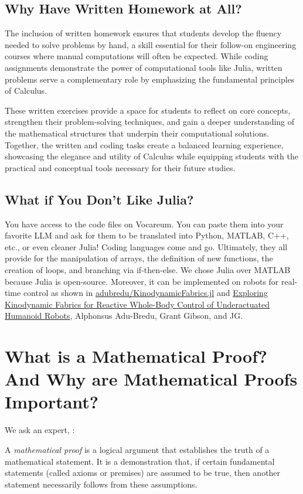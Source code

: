 \subsection{Why Have Written Homework at All?}

The inclusion of written homework ensures that students develop the fluency needed to solve problems by hand, a skill essential for their follow-on engineering courses where manual computations will often be expected. While coding assignments demonstrate the power of computational tools like Julia, written problems serve a complementary role by emphasizing the fundamental principles of Calculus.

These written exercises provide a space for students to reflect on core concepts, strengthen their problem-solving techniques, and gain a deeper understanding of the mathematical structures that underpin their computational solutions. Together, the written and coding tasks create a balanced learning experience, showcasing the elegance and utility of Calculus while equipping students with the practical and conceptual tools necessary for their future studies.

\subsection{What if You Don't Like Julia?}

You have access to the code files on Vocareum. You can paste them into your favorite LLM and ask for them to be translated into Python, MATLAB, C++, etc., or even cleaner Julia! Coding languages come and go. Ultimately, they all provide for the manipulation of arrays, the definition of new functions, the creation of loops, and branching via if-then-else. We chose Julia over MATLAB because Julia is open-source. Moreover, it can be implemented on robots for real-time control as shown in \href{https://github.com/adubredu/KinodynamicFabrics.jl}{adubredu/KinodynamicFabrics.jl} and \href{https://arxiv.org/abs/2303.04279}{Exploring Kinodynamic Fabrics for Reactive Whole-Body Control of Underactuated Humanoid Robots}, Alphonsus Adu-Bredu, Grant Gibson, and JG.

\section{What is a Mathematical Proof? And Why are Mathematical Proofs Important?}

We ask an expert, \chatgpt :

A \textit{mathematical proof} is a logical argument that establishes the truth of a mathematical statement. It is a demonstration that, if certain fundamental statements (called axioms or premises) are assumed to be true, then another statement necessarily follows from these assumptions.

